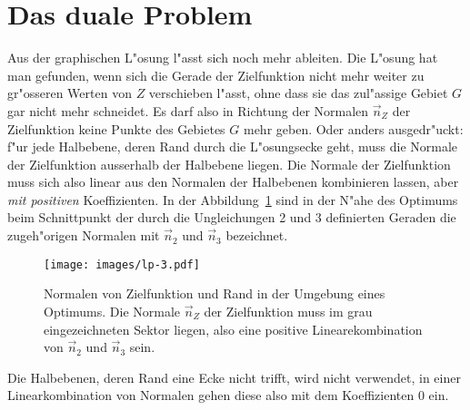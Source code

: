 \section{Das duale Problem\label{lp:section:dual}}
Aus der graphischen L"osung l"asst sich noch mehr ableiten.
Die L"osung hat man gefunden, wenn sich die Gerade der Zielfunktion
nicht mehr weiter zu gr"osseren Werten von $Z$ verschieben l"asst, ohne
dass sie das zul"assige Gebiet $G$ gar nicht mehr schneidet.
Es darf also in Richtung der Normalen $\vec n_Z$ der Zielfunktion keine Punkte
des Gebietes $G$ mehr geben. Oder anders ausgedr"uckt: f"ur jede
Halbebene, deren Rand durch die L"osungsecke geht, muss die Normale der
Zielfunktion ausserhalb der Halbebene liegen.
Die Normale der Zielfunktion muss sich also linear aus den Normalen
der Halbebenen kombinieren lassen, aber {\em mit positiven} Koeffizienten.
In der Abbildung~\ref{lp:normalen} sind in der N"ahe des Optimums beim
Schnittpunkt der durch die Ungleichungen 2 und 3 definierten Geraden
die zugeh"origen Normalen mit $\vec n_2$ und $\vec n_3$ bezeichnet.
\begin{figure}
\begin{center}
\texttt{[image: images/lp-3.pdf]}
\end{center}
\caption{Normalen von Zielfunktion und Rand in der Umgebung eines Optimums.
Die Normale $\vec n_Z$ der Zielfunktion muss im grau eingezeichneten
Sektor liegen, also eine positive Linearekombination von $\vec n_2$ und
$\vec n_3$ sein.
\label{lp:normalen}}
\end{figure}

Die Halbebenen, deren Rand eine Ecke nicht trifft, wird nicht verwendet,
in einer Linearkombination von Normalen gehen diese also mit dem
Koeffizienten $0$ ein.


